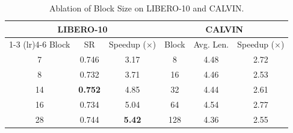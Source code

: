 \begin{table}[t]
\setlength{\tabcolsep}{5pt}
\renewcommand{\arraystretch}{0.95}
\centering
\small
\caption{Ablation of Block Size  on LIBERO-10 and CALVIN. 
}
\label{tab:blocksize_combined}

\begin{tabular}{c c c |c c c}
\toprule
\multicolumn{3}{c}{LIBERO-10} & \multicolumn{3}{c}{CALVIN} \\
\cmidrule(lr){1-3} \cmidrule(lr){4-6}
Block & SR & Speedup ($\times$) 
& Block & Avg. Len. & Speedup ($\times$) \\
\midrule

7   & 0.746 & 3.17  & 8   & 4.48 & 2.72 \\
\rowcolor{gray!15}
8   & 0.732 & 3.71  & 16  & 4.46 & 2.53 \\
14  & \textbf{0.752} & 4.85  & 32  & 4.44 & 2.61 \\
\rowcolor{gray!15}
16  & 0.734 & 5.04  & 64  & 4.54 & 2.77 \\
28  & 0.744 & \textbf{5.42} & 128 & 4.36 & 2.55 \\

\bottomrule
\end{tabular}
\end{table}

